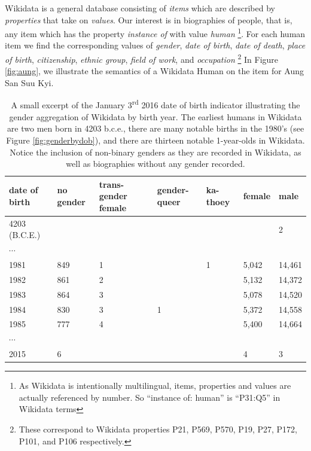 \documentclass{sig-alternate-05-2015}
\begin{document}
Wikidata is a general database consisting of \textit{items} which are described by \textit{properties} that take on \textit{values}. Our interest is in biographies of people, that is, any item which has the property \textit{instance of} with value \textit{human} \footnote{As Wikidata is intentionally multilingual, items, properties and values are actually referenced by number. So ``instance of: human'' is ``P31:Q5'' in Wikidata terms }. For each human item we find the corresponding values of \textit{gender}, \textit{date of birth}, \textit{date of death}, \textit{place of birth}, \textit{citizenship}, \textit{ethnic group}, \textit{field of work}, and \textit{occupation} \footnote{These correspond to Wikidata properties P21, P569, P570, P19, P27, P172, P101, and P106 respectively.} In Figure \ref{fig:aung}, we illustrate the semantics of a Wikidata Human on the item for Aung San Suu Kyi.
 
\begin{table}
\caption{A small excerpt of the January 3\textsuperscript{rd} 2016 date of birth indicator illustrating the gender aggregation of Wikidata by birth year. The earliest humans in Wikidata are two men born in 4203 b.c.e., there are many notable births in the 1980's (see Figure \ref{fig:genderbydob}), and there are thirteen notable 1-year-olds in Wikidata. Notice the inclusion of non-binary genders as they are recorded in Wikidata, as well as biographies without any gender recorded.}
\begin{tabular} {p{0.75cm}p{0.75cm}p{0.75cm}p{0.75cm}p{0.75cm}p{0.75cm}p{0.75cm}}
\toprule
date of birth & no gender & trans-gender female & gender-queer & ka-thoey & female & male \\
\midrule
4203 \small{(B.C.E.)} & & & & & & 2   \\ 
$\cdots$ &  &  &  & &  &    \\ 
1981 & 849 & 1 &  & 1 &5,042 & 14,461 \\ 
1982 & 861 & 2 &  & &5,132 & 14,372  \\ 
1983 & 864 & 3 &  & &5,078 & 14,520  \\ 
1984 & 830 & 3 & 1 & &5,372 & 14,558   \\ 
1985 & 777 & 4 &  & &5,400 & 14,664  \\ 
$\cdots$ &  &  &  & &  &    \\ 
2015 & 6 &  &  & & 4 & 3  \\ 
\bottomrule
\end{tabular}
\label{table:dob}
\end{table}
\end{document}
